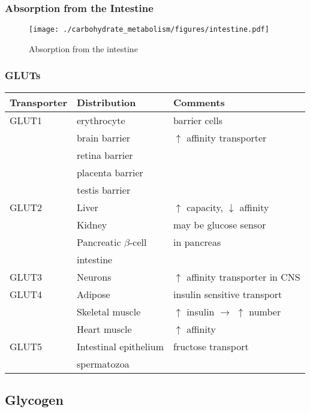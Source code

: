 \documentclass{scrartcl}
\begin{document}
\subsubsection{Absorption from the Intestine}
\label{sec:org0711dc2}

\begin{figure}[htbp]
\centering
\texttt{[image: ./carbohydrate\_metabolism/figures/intestine.pdf]}
\caption{\label{fig:orgaae3c3a}
Absorption from the intestine}
\end{figure}

\subsubsection{GLUTs}
\label{sec:org34ef314}

\begin{center}
\begin{tabular}{lll}
Transporter & Distribution & Comments\\
\hline
GLUT1 & erythrocyte & barrier cells\\
 & brain barrier & \(\uparrow\) affinity transporter\\
 & retina barrier & \\
 & placenta barrier & \\
 & testis barrier & \\
\hline
GLUT2 & Liver & \(\uparrow\) capacity, \(\downarrow\) affinity\\
 & Kidney & may be glucose sensor\\
 & Pancreatic \(\beta\)-cell & in pancreas\\
 & intestine & \\
\hline
GLUT3 & Neurons & \(\uparrow\) affinity  transporter in CNS\\
\hline
GLUT4 & Adipose & insulin sensitive transport\\
 & Skeletal muscle & \(\uparrow\) insulin \(\to\) \(\uparrow\) number\\
 & Heart muscle & \(\uparrow\) affinity\\
\hline
GLUT5 & Intestinal epithelium & fructose transport\\
 & spermatozoa & \\
\end{tabular}
\end{center}

\subsection{Glycogen}
\label{sec:org91ca49a}
\end{document}
